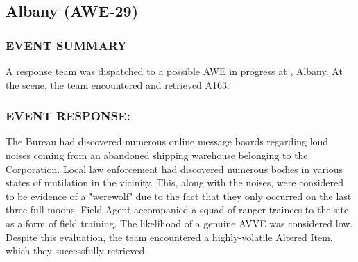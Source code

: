\subsection*{Albany (AWE-29)}
\subsubsection*{EVENT SUMMARY}
\par A response team was dispatched to a possible AWE in progress
at , Albany. At the scene, the team encountered and retrieved A163.
\subsubsection*{EVENT RESPONSE:}
\par The Bureau had discovered numerous online message boards
regarding loud noises coming from an abandoned shipping
warehouse belonging to the  Corporation. Local law enforcement had discovered numerous bodies in various states of
mutilation in the vicinity. This, along with the noises, were
considered to be evidence of a "werewolf" due to the fact that
they only occurred on the last three full moons.
Field Agent  accompanied a squad of ranger trainees to the site as a form of field training. The likelihood of a genuine AVVE was considered low. Despite this evaluation, the team
encountered a highly-volatile Altered Item, which they
successfully retrieved.